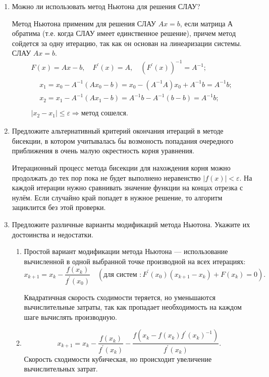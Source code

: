 \documentclass[12pt, a4paper]{article}
\begin{document}
\begin{enumerate}
\item Можно ли использовать метод Ньютона для решения СЛАУ?

Метод Ньютона применим для решения СЛАУ $Ax=b$, если матрица $А$ обратима (т.е. когда СЛАУ имеет единственное решение), причем метод сойдется за одну итерацию, так как он основан на линеаризации системы.  
СЛАУ $ A x = b $.
\begin{gather*}
F(x) = A x - b, \quad F^'(x) = A, \quad (F^'(x))^{-1} = A^{-1}; \\
\begin{aligned}
&x_1 = x_0 - A^{-1} (A x_0 - b) = x_0 - (A^{-1} A) x_0 + A^{-1} b = A^{-1} b; \\
&x_2 = x_1 - A^{-1} (A x_1 - b) = A^{-1} b - A^{-1} (b - b) = A^{-1} b; \\
\end{aligned} \\
| x_2 - x_1 | \le \varepsilon \Longrightarrow \text{метод сошелся}.
\end{gather*}

\item Предложите альтернативный критерий окончания итераций в методе бисекции, в котором учитывалась бы возмоность попадания очередного приближения в очень малую окрестность корня уравнения.

Итерационный процесс метода бисекции для нахождения корня можно продолжать до тех пор пока не будет выполнено неравенство $|f(x)|<\varepsilon$. На каждой итерации нужно сравнивать значение функции на концах отрезка с нулём. Если случайно край попадет в нужное решение, то алгоритм зациклится без этой проверки.\\

\item Предложите различные варианты модификаций метода Ньютона. Укажите их достоинства и недостатки.

\begin{enumerate}
\item Простой вариант модификации метода Ньютона --- использование вычисленной в одной выбранной точке производной на всех итерациях:
\[ 
x_{k + 1} = x_k - \dfrac{f(x_{k})}{f^'(x_{0})} \quad (\text{для систем }\colon F^'(x_{0}) (x_{k+1} - x_{k}) + F(x_{k}) = 0 ).
\]

Квадратичная скорость сходимости теряется, но уменьшаются вычислительные затраты, так как пропадает необходимость на каждом шаге вычислять производную. 
			
\item
\[
 x_{k+1} = x_{k} - \frac{f(x_{k})}{f^'(x_{k})} - \frac{f(x_{k} - f(x_{k}) f^'(x_{k})^{-1})}{f^'(x_{k})} .
\]
Скорость сходимости кубическая, но происходит увеличение вычислительных затрат.\\
			

\end{enumerate}
\end{enumerate}
\end{document}
